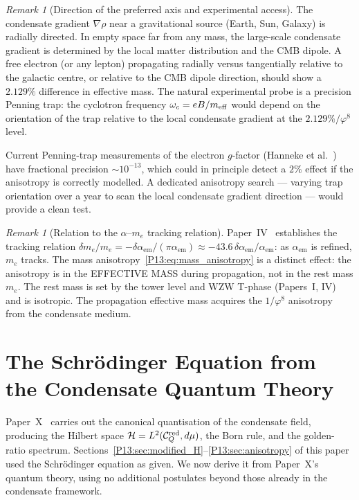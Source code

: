 \documentclass[11pt,a4paper]{article}
\theoremstyle{definition}
\theoremstyle{remark}
\newtheorem{remark}[theorem]{Remark}
\newcommand{\vp}{\varphi}
\newcommand{\aem}{\alpha_{\mathrm{em}}}
\begin{document}
\begin{remark}[Direction of the preferred axis and experimental access]
\label{P13:rem:experimental_access}
The condensate gradient $\nabla\rho$ near a gravitational source
(Earth, Sun, Galaxy) is radially directed.
In empty space far from any mass, the large-scale condensate
gradient is determined by the local matter distribution and the
CMB dipole.
A free electron (or any lepton) propagating radially versus
tangentially relative to the galactic centre, or relative to
the CMB dipole direction, should show a $2.129\%$ difference
in effective mass.
The natural experimental probe is a precision Penning trap:
the cyclotron frequency $\omega_c = eB/m_{\rm eff}$ would depend
on the orientation of the trap relative to the local condensate
gradient at the $2.129\%/\vp^8$ level.

Current Penning-trap measurements of the electron $g$-factor
(Hanneke et al.~\cite{Hanneke2008}) have fractional precision
$\sim10^{-13}$, which could in principle detect a $2\%$ effect
if the anisotropy is correctly modelled.
A dedicated anisotropy search --- varying trap orientation
over a year to scan the local condensate gradient direction ---
would provide a clean test.
\end{remark}

\begin{remark}[Relation to the $\alpha$--$m_e$ tracking relation]
\label{P13:rem:tracking_relation}
Paper~IV~\cite{Paper4} establishes the tracking relation
$\delta m_e/m_e = -\delta\aem/(\pi\aem) \approx -43.6\,\delta\aem/\aem$:
as $\aem$ is refined, $m_e$ tracks.
The mass anisotropy~\eqref{P13:eq:mass_anisotropy} is a distinct
effect: the anisotropy is in the EFFECTIVE MASS during propagation,
not in the rest mass $m_e$.
The rest mass is set by the tower level and WZW T-phase (Papers~I, IV)
and is isotropic.
The propagation effective mass acquires the $1/\vp^8$ anisotropy
from the condensate medium.
\end{remark}

\section{The Schr\"odinger Equation from the Condensate Quantum Theory}
\label{P13:sec:schrodinger}

Paper~X~\cite{Paper10} carries out the canonical quantisation of the
condensate field, producing the Hilbert space
$\mathcal{H}=L^2(\mathcal{C}_Q^{\rm red},d\mu)$, the Born rule,
and the golden-ratio spectrum.
Sections~\ref{P13:sec:modified_H}--\ref{P13:sec:anisotropy} of this paper
used the Schr\"odinger equation as given.
We now derive it from Paper~X's quantum theory,
using no additional postulates beyond those already in the condensate framework.
\end{document}
